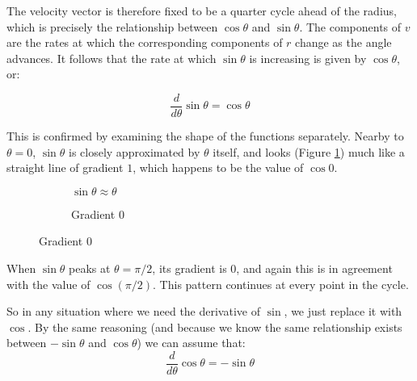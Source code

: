 The velocity vector is therefore fixed to be a quarter cycle ahead of the radius, which is precisely the relationship between $\cos \theta$ and $\sin \theta$. The components of $v$ are the rates at which the corresponding components of $r$ change as the angle advances. It follows that the rate at which $\sin \theta$ is increasing is given by $\cos \theta$, or:

$$
\frac{d}{d\theta} \sin \theta = \cos \theta
$$

This is confirmed by examining the shape of the functions separately. Nearby to $\theta = 0$, $\sin \theta$ is closely approximated by $\theta$ itself, and looks (Figure \ref{fig:sin-small}) much like a straight line of gradient $1$, which happens to be the value of $\cos 0$.

\begin{figure}[h]    
    \caption{Gradients of Sine}
    \begin{subfigure}{0.5\textwidth}
        \centering
    \caption{$\sin \theta \approx \theta$} \label{fig:sin-small}
    \end{subfigure}
    \begin{subfigure}{0.5\textwidth}
        \centering
        \caption{Gradient $0$} \label{fig:sin-peak}
    \end{subfigure}
\end{figure}

When $\sin \theta$ peaks at $\theta = \pi/2$, its gradient is $0$, and again this is in agreement with the value of $\cos (\pi/2)$. This pattern continues at every point in the cycle.

So in any situation where we need the derivative of $\sin$, we just replace it with $\cos$. By the same reasoning (and because we know the same relationship exists between $-\sin \theta$ and $\cos \theta$) we can assume that:
$$
\frac{d}{d\theta} \cos \theta = -\sin \theta
$$

